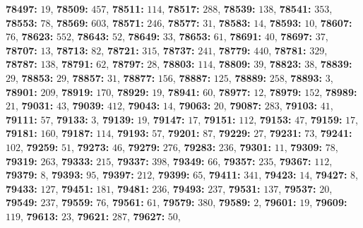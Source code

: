 \textsf{\bfseries 78497:} $19$, \textsf{\bfseries 78509:} $457$, \textsf{\bfseries 78511:} $114$, \textsf{\bfseries 78517:} $288$, \textsf{\bfseries 78539:} $138$, \textsf{\bfseries 78541:} $353$, \textsf{\bfseries 78553:} $78$, \textsf{\bfseries 78569:} $603$, \textsf{\bfseries 78571:} $246$, \textsf{\bfseries 78577:} $31$, \textsf{\bfseries 78583:} $14$, \textsf{\bfseries 78593:} $10$, \textsf{\bfseries 78607:} $76$, \textsf{\bfseries 78623:} $552$, \textsf{\bfseries 78643:} $52$, \textsf{\bfseries 78649:} $33$, \textsf{\bfseries 78653:} $61$, \textsf{\bfseries 78691:} $40$, \textsf{\bfseries 78697:} $37$, \textsf{\bfseries 78707:} $13$, \textsf{\bfseries 78713:} $82$, \textsf{\bfseries 78721:} $315$, \textsf{\bfseries 78737:} $241$, \textsf{\bfseries 78779:} $440$, \textsf{\bfseries 78781:} $329$, \textsf{\bfseries 78787:} $138$, \textsf{\bfseries 78791:} $62$, \textsf{\bfseries 78797:} $28$, \textsf{\bfseries 78803:} $114$, \textsf{\bfseries 78809:} $39$, \textsf{\bfseries 78823:} $38$, \textsf{\bfseries 78839:} $29$, \textsf{\bfseries 78853:} $29$, \textsf{\bfseries 78857:} $31$, \textsf{\bfseries 78877:} $156$, \textsf{\bfseries 78887:} $125$, \textsf{\bfseries 78889:} $258$, \textsf{\bfseries 78893:} $3$, \textsf{\bfseries 78901:} $209$, \textsf{\bfseries 78919:} $170$, \textsf{\bfseries 78929:} $19$, \textsf{\bfseries 78941:} $60$, \textsf{\bfseries 78977:} $12$, \textsf{\bfseries 78979:} $152$, \textsf{\bfseries 78989:} $21$, \textsf{\bfseries 79031:} $43$, \textsf{\bfseries 79039:} $412$, \textsf{\bfseries 79043:} $14$, \textsf{\bfseries 79063:} $20$, \textsf{\bfseries 79087:} $283$, \textsf{\bfseries 79103:} $41$, \textsf{\bfseries 79111:} $57$, \textsf{\bfseries 79133:} $3$, \textsf{\bfseries 79139:} $19$, \textsf{\bfseries 79147:} $17$, \textsf{\bfseries 79151:} $112$, \textsf{\bfseries 79153:} $47$, \textsf{\bfseries 79159:} $17$, \textsf{\bfseries 79181:} $160$, \textsf{\bfseries 79187:} $114$, \textsf{\bfseries 79193:} $57$, \textsf{\bfseries 79201:} $87$, \textsf{\bfseries 79229:} $27$, \textsf{\bfseries 79231:} $73$, \textsf{\bfseries 79241:} $102$, \textsf{\bfseries 79259:} $51$, \textsf{\bfseries 79273:} $46$, \textsf{\bfseries 79279:} $276$, \textsf{\bfseries 79283:} $236$, \textsf{\bfseries 79301:} $11$, \textsf{\bfseries 79309:} $78$, \textsf{\bfseries 79319:} $263$, \textsf{\bfseries 79333:} $215$, \textsf{\bfseries 79337:} $398$, \textsf{\bfseries 79349:} $66$, \textsf{\bfseries 79357:} $235$, \textsf{\bfseries 79367:} $112$, \textsf{\bfseries 79379:} $8$, \textsf{\bfseries 79393:} $95$, \textsf{\bfseries 79397:} $212$, \textsf{\bfseries 79399:} $65$, \textsf{\bfseries 79411:} $341$, \textsf{\bfseries 79423:} $14$, \textsf{\bfseries 79427:} $8$, \textsf{\bfseries 79433:} $127$, \textsf{\bfseries 79451:} $181$, \textsf{\bfseries 79481:} $236$, \textsf{\bfseries 79493:} $237$, \textsf{\bfseries 79531:} $137$, \textsf{\bfseries 79537:} $20$, \textsf{\bfseries 79549:} $237$, \textsf{\bfseries 79559:} $76$, \textsf{\bfseries 79561:} $61$, \textsf{\bfseries 79579:} $380$, \textsf{\bfseries 79589:} $2$, \textsf{\bfseries 79601:} $19$, \textsf{\bfseries 79609:} $119$, \textsf{\bfseries 79613:} $23$, \textsf{\bfseries 79621:} $287$, \textsf{\bfseries 79627:} $50$, 
